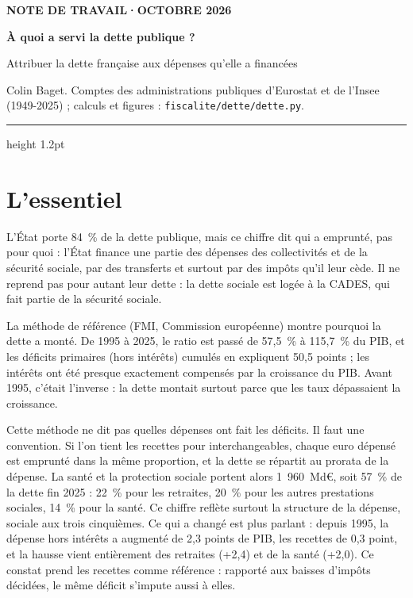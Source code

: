 \documentclass[11pt,a4paper]{article}
\begin{document}
\renewcommand{\figurename}{Figure}\renewcommand{\tablename}{Tableau}

\thispagestyle{empty}
\vspace*{0.6cm}
{\footnotesize\color{ocre}\bfseries NOTE DE TRAVAIL\quad·\quad OCTOBRE 2026\par}
\vspace{8pt}
{\fontsize{24}{28}\selectfont\bfseries\color{bleu}À quoi a servi la dette publique ?\par}
\vspace{6pt}
{\large Attribuer la dette française aux dépenses qu'elle a financées\par}
\vspace{8pt}
{\small Colin Baget. Comptes des administrations publiques d'Eurostat et de l'Insee (1949-2025) ;
calculs et figures : \texttt{fiscalite/dette/dette.py}.\par}
\vspace{6pt}
{\color{bleu}\hrule height 1.2pt}
\vspace{4pt}

\section*{L'essentiel}

L'État porte 84~\% de la dette publique, mais ce chiffre dit qui a emprunté, pas pour quoi :
l'État finance une partie des dépenses des collectivités et de la sécurité sociale, par des
transferts et surtout par des impôts qu'il leur cède. Il ne reprend pas pour autant leur dette :
la dette sociale est logée à la CADES, qui fait partie de la sécurité sociale.

La méthode de référence (FMI, Commission européenne) montre pourquoi la dette a monté. De 1995 à
2025, le ratio est passé de 57,5~\% à 115,7~\% du PIB, et les déficits primaires (hors intérêts)
cumulés en expliquent 50,5 points ; les intérêts ont été presque exactement compensés par la
croissance du PIB. Avant 1995, c'était l'inverse : la dette montait surtout parce que les taux
dépassaient la croissance.

Cette méthode ne dit pas quelles dépenses ont fait les déficits. Il faut une convention. Si l'on
tient les recettes pour interchangeables, chaque euro dépensé est emprunté dans la même proportion,
et la dette se répartit au prorata de la dépense. La santé et la protection sociale portent alors
1~960~Md€, soit 57~\% de la dette fin 2025 : 22~\% pour les retraites, 20~\% pour les autres
prestations sociales, 14~\% pour la santé. Ce chiffre reflète surtout la structure de la dépense,
sociale aux trois cinquièmes. Ce qui a changé est plus parlant : depuis 1995, la dépense hors
intérêts a augmenté de 2,3 points de PIB, les recettes de 0,3 point, et la hausse vient entièrement
des retraites (+2,4) et de la santé (+2,0). Ce constat prend les recettes comme référence : rapporté
aux baisses d'impôts décidées, le même déficit s'impute aussi à elles.
\end{document}
